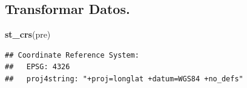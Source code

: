 \documentclass[11pt,]{article}
\newenvironment{Shaded}{\begin{snugshade}}{\end{snugshade}}
\newcommand{\KeywordTok}[1]{\textcolor[rgb]{0.13,0.29,0.53}{\textbf{#1}}}
\newcommand{\DataTypeTok}[1]{\textcolor[rgb]{0.13,0.29,0.53}{#1}}
\newcommand{\DecValTok}[1]{\textcolor[rgb]{0.00,0.00,0.81}{#1}}
\newcommand{\StringTok}[1]{\textcolor[rgb]{0.31,0.60,0.02}{#1}}
\newcommand{\OperatorTok}[1]{\textcolor[rgb]{0.81,0.36,0.00}{\textbf{#1}}}
\newcommand{\NormalTok}[1]{#1}
\begin{document}
\subsection{Transformar Datos.}\label{transformar-datos.}

\begin{Shaded}
\begin{Highlighting}[]
\KeywordTok{st_crs}\NormalTok{(pre)}
\end{Highlighting}
\end{Shaded}

\begin{verbatim}
## Coordinate Reference System:
##   EPSG: 4326 
##   proj4string: "+proj=longlat +datum=WGS84 +no_defs"
\end{verbatim}

\begin{Shaded}
\end{Shaded}
\end{document}

